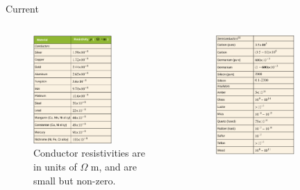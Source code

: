 \documentclass{beamer}
\begin{document}
\begin{frame}{Current}
\begin{columns}[T]
\begin{column}{0.5\textwidth}
\begin{figure}
\centering
\includegraphics[width=0.7\textwidth]{figures/rho1.png}
\caption{\label{fig:rho1} Conductor resistivities are in units of $\Omega$ m, and are small but non-zero.}
\end{figure}
\end{column}
\begin{column}{0.5\textwidth}
\begin{figure}
\centering
\includegraphics[width=0.7\textwidth]{figures/rho2.png}

\end{figure}
\end{column}
\end{columns}
\end{frame}
\end{document}
